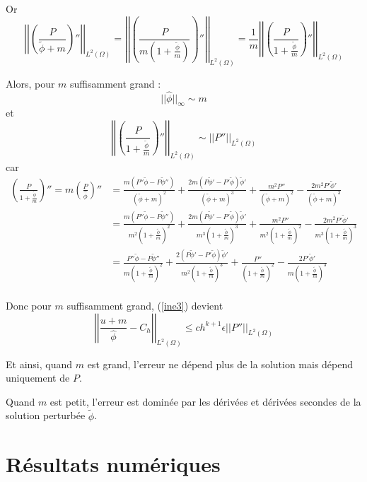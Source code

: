 \documentclass[french]{article}
\begin{document}
	Or 
	$$\left|\left|\left(\frac{P}{\tilde{\phi}+m}\right)''\right|\right|_{L^2(\Omega)}=\left|\left|\left(\frac{P}{m\left(1+\frac{\tilde{\phi}}{m}\right)}\right)''\right|\right|_{L^2(\Omega)}=\frac{1}{m}\left|\left|\left(\frac{P}{1+\frac{\tilde{\phi}}{m}}\right)''\right|\right|_{L^2(\Omega)}$$

	Alors, pour $m$ suffisamment grand :
	$$||\hat{\phi}||_\infty\sim m$$
	et
	$$\left|\left|\left(\frac{P}{1+\frac{\tilde{\phi}}{m}}\right)''\right|\right|_{L^2(\Omega)}\sim\left|\left|P''\right|\right|_{L^2(\Omega)}$$
	car
	\begin{align*}
		\left(\frac{P}{1+\frac{\tilde{\phi}}{m}}\right)''=m\left(\frac{P}{\hat{\phi}}\right)''&=\frac{m(P''\tilde{\phi}-P\tilde{\phi}'')}{(\tilde{\phi}+m)^2}+\frac{2m(P\tilde{\phi}'-P'\tilde{\phi})\tilde{\phi}'}{(\tilde{\phi}+m)^3}+    \frac{m^2P''}{(\tilde{\phi}+m)^2}-\frac{2m^2P'\tilde{\phi}'}{(\tilde{\phi}+m)^3} \\
		&=\frac{m(P''\tilde{\phi}-P\tilde{\phi}'')}{m^2\left(1+\frac{\tilde{\phi}}{m}\right)^2}+\frac{2m(P\tilde{\phi}'-P'\tilde{\phi})\tilde{\phi}'}{m^3\left(1+\frac{\tilde{\phi}}{m}\right)^3}+    \frac{m^2P''}{m^2\left(1+\frac{\tilde{\phi}}{m}\right)^2}-\frac{2m^2P'\tilde{\phi}'}{m^3\left(1+\frac{\tilde{\phi}}{m}\right)^3} \\
		&=\frac{P''\tilde{\phi}-P\tilde{\phi}''}{m\left(1+\frac{\tilde{\phi}}{m}\right)^2}+\frac{2(P\tilde{\phi}'-P'\tilde{\phi})\tilde{\phi}'}{m^2\left(1+\frac{\tilde{\phi}}{m}\right)^3}+    \frac{P''}{\left(1+\frac{\tilde{\phi}}{m}\right)^2}-\frac{2P'\tilde{\phi}'}{m\left(1+\frac{\tilde{\phi}}{m}\right)^3} \\
	\end{align*}
	
	Donc pour $m$ suffisamment grand, (\ref{ine3}) devient
	\begin{equation}
		\left|\left|\frac{u+m}{\hat{\phi}}-C_h\right|\right|_{L^2(\Omega)}\le ch^{k+1}\epsilon\left|\left|P''\right|\right|_{L^2(\Omega)} \label{ine3_bis}
	\end{equation}
	
	Et ainsi, quand $m$ est grand, l'erreur ne dépend plus de la solution mais dépend uniquement de $P$.
	
	Quand $m$ est petit, l'erreur est dominée par les dérivées et dérivées secondes de la solution perturbée $\tilde{\phi}$.
	
	\section*{Résultats numériques}
	
\end{document}
